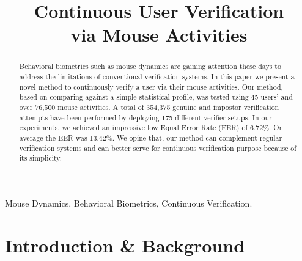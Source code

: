 \documentclass[conference]{IEEEtran}
\begin{document}
\title{Continuous User Verification\\via Mouse Activities}


\author{
}


\maketitle


\begin{abstract}
Behavioral biometrics such as mouse dynamics are gaining attention these days to address the limitations of
conventional verification systems. In this paper we present a novel method to continuously verify a user via
their mouse activities. Our method, based on comparing against a simple statistical profile, was tested using 45 users’ and over 76,500 mouse activities.
A total of 354,375 genuine and impostor verification attempts have been performed by deploying 175 different verifier
setups. In our experiments, we achieved an impressive low Equal Error Rate (EER) of 6.72\%. On average the EER
was 13.42\%. We opine that, our method can complement regular verification systems and can better serve for
continuous verification purpose because of its simplicity.
\end{abstract}
\begin{IEEEkeywords} 
Mouse Dynamics,
Behavioral Biometrics,
Continuous Verification.
 \end{IEEEkeywords}
\IEEEpeerreviewmaketitle

\section{Introduction \& Background}
\end{document}
